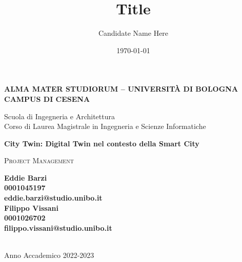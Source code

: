 \title{Title}
\author{Candidate Name Here}
\date{\today}

\begin{titlepage}
	\begin{center}
		
		\large
		\textbf{ALMA MATER STUDIORUM -- UNIVERSITÀ DI BOLOGNA \\ CAMPUS DI CESENA}
		\\
		\noindent\hrulefill
		\vspace{0.4cm}
		
		\Large
		Scuola di Ingegneria e Architettura \\
		Corso di Laurea Magistrale in Ingegneria e Scienze Informatiche
		
		\Huge
		\vspace{4cm}
		\textbf{
			City Twin: Digital Twin nel contesto della Smart City
		}
		
		\large
		\vspace{1cm}
		\textsc{Project Management}
		
		\vspace{5.5cm}
		\begin{minipage}[t]{0.64\textwidth}
			\begin{flushleft}
				\textbf{Eddie Barzi}
				\\
				\textbf{0001045197}
				\\
				\textbf{eddie.barzi@studio.unibo.it}
				\\
				\vspace{0.4cm}
				\textbf{Filippo Vissani}
				\\
				\textbf{0001026702}
				\\
				\textbf{filippo.vissani@studio.unibo.it}
			\end{flushleft}
		\end{minipage}
		
		\vfill
		\noindent\hrulefill
		\vspace{0.3cm}
		\Large
		\\
		Anno Accademico 2022-2023
	\end{center}
\end{titlepage}
\restoregeometry

